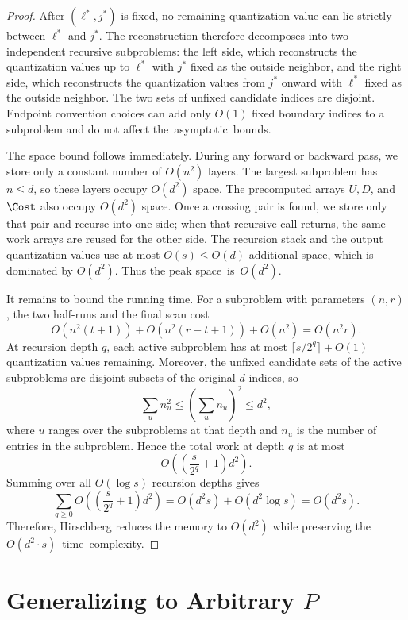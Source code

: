 \documentclass[11pt,letterpaper]{article}
\begin{document}
{\begin{proof}
After $(\ell^*,j^*)$ is fixed, no remaining quantization value can lie strictly between $\ell^*$ and $j^*$. The reconstruction therefore decomposes into two independent recursive subproblems: the left side, which reconstructs the quantization values up to $\ell^*$ with $j^*$ fixed as the outside neighbor, and the right side, which reconstructs the quantization values from $j^*$ onward with $\ell^*$ fixed as the outside neighbor. The two sets of unfixed candidate indices are disjoint. Endpoint convention choices can add only $O(1)$ fixed boundary indices to a subproblem and do not affect \mbox{the asymptotic bounds.}

The space bound follows immediately. During any forward or backward pass, we store only a constant number of $O(n^2)$ layers. The largest subproblem has $n\le d$, so these layers occupy $O(d^2)$ space. The precomputed arrays $U,D$, and $\Cost$ also occupy $O(d^2)$ space. Once a crossing pair is found, we store only that pair and recurse into one side; when that recursive call returns, the same work arrays are reused for the other side. The recursion stack and the output quantization values use at most $O(s)\le O(d)$ additional space, which is dominated by $O(d^2)$. Thus the peak \mbox{space is $O(d^2)$.}

It remains to bound the running time. For a subproblem with parameters $(n,r)$, the two half-runs and the final scan cost
\[
  O(n^2(t+1)) + O(n^2(r-t+1)) + O(n^2) = O(n^2 r).
\]
At recursion depth $q$, each active subproblem has at most $\lceil s/2^q\rceil+O(1)$ quantization values remaining. Moreover, the unfixed candidate sets of the active subproblems are disjoint subsets of the original $d$ indices, so
\[
  \sum_{u} n_u^2 \le \left(\sum_{u} n_u\right)^2 \le d^2,
\]
where $u$ ranges over the subproblems at that depth and $n_u$ is the number of entries in the subproblem. Hence the total work at depth $q$ is at most
\[
  O\!\left(\left(\frac{s}{2^q}+1\right)d^2\right).
\]
Summing over all $O(\log s)$ recursion depths gives
\[
  \sum_{q\ge 0} O\!\left(\left(\frac{s}{2^q}+1\right)d^2\right)
  = O(d^2s) + O(d^2\log s)
  = O(d^2s).
\]
Therefore, Hirschberg reduces the memory to $O(d^2)$ while preserving the \mbox{$O(d^2\cdot s)$ time complexity.}
\end{proof}

\section{Generalizing to Arbitrary $P$}
\label{app:general-p}

}
\end{document}

